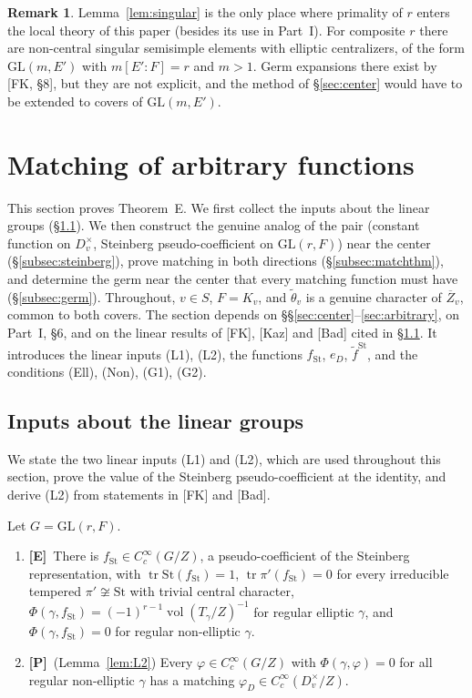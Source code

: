 \documentclass[12pt]{article}
\newcommand{\ov}[1]{\overline{#1}}
\newcommand{\tr}{\operatorname{tr}}
\newcommand{\vol}{\operatorname{vol}}
\newcommand{\GL}{\mathrm{GL}}
\newcommand{\St}{\mathrm{St}}
\newcommand{\Zb}{\ov{Z}}
\newcommand{\Pv}{\textbf{[P]}}
\newcommand{\Ev}{\textbf{[E]}}
\theoremstyle{plain}
\theoremstyle{definition}
\newtheorem{remark}[theorem]{Remark}
\begin{document}
\begin{remark}
Lemma~\ref{lem:singular} is the only place where primality of $r$ enters the local theory of this paper (besides its use in Part~I). For composite $r$ there are non-central singular semisimple elements with elliptic centralizers, of the form $\GL(m,E')$ with $m[E':F]=r$ and $m>1$. Germ expansions there exist by [FK, \S8], but they are not explicit, and the method of \S\ref{sec:center} would have to be extended to covers of $\GL(m,E')$.
\end{remark}

\section{Matching of arbitrary functions}\label{sec:matching}
This section proves Theorem~E. We first collect the inputs about the linear groups (\S\ref{subsec:linear}). We then construct the genuine analog of the pair (constant function on $D_v^\times$, Steinberg pseudo-coefficient on $\GL(r,F)$) near the center (\S\ref{subsec:steinberg}), prove matching in both directions (\S\ref{subsec:matchthm}), and determine the germ near the center that every matching function must have (\S\ref{subsec:germ}). Throughout, $v\in S$, $F=K_v$, and $\tilde\theta_v$ is a genuine character of $\Zb_v$, common to both covers. The section depends on \S\S\ref{sec:center}--\ref{sec:arbitrary}, on Part~I, \S6, and on the linear results of [FK], [Kaz] and [Bad] cited in \S\ref{subsec:linear}. It introduces the linear inputs (L1), (L2), the functions $f_{\St}$, $e_D$, $\tilde f^{\St}$, and the conditions (Ell), (Non), (G1), (G2).

\subsection{Inputs about the linear groups}\label{subsec:linear}
We state the two linear inputs (L1) and (L2), which are used throughout this section, prove the value of the Steinberg pseudo-coefficient at the identity, and derive (L2) from statements in [FK] and [Bad].

Let $G=\GL(r,F)$.
\begin{enumerate}[label=(L\arabic*)]
\item \Ev\ There is $f_{\St}\in C_c^\infty(G/Z)$, a pseudo-coefficient of the Steinberg representation, with $\tr\St(f_{\St})=1$, $\tr\pi'(f_{\St})=0$ for every irreducible tempered $\pi'\not\cong\St$ with trivial central character, $\Phi(\gamma,f_{\St})=(-1)^{r-1}\vol(T_\gamma/Z)^{-1}$ for regular elliptic $\gamma$, and $\Phi(\gamma,f_{\St})=0$ for regular non-elliptic $\gamma$.
\item \Pv\ (Lemma~\ref{lem:L2}) Every $\varphi\in C_c^\infty(G/Z)$ with $\Phi(\gamma,\varphi)=0$ for all regular non-elliptic $\gamma$ has a matching $\varphi_D\in C_c^\infty(D_v^\times/Z)$.
\end{enumerate}
\end{document}
